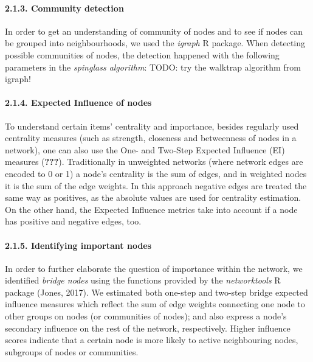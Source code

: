 \documentclass[
]{article}
\begin{document}
\hypertarget{community-detection}{%
\paragraph{2.1.3. Community detection}\label{community-detection}}

In order to get an understanding of community of nodes and to see if
nodes can be grouped into neighbourhoods, we used the \emph{igraph} R
package. When detecting possible communities of nodes, the detection
happened with the following parameters in the \emph{spinglass
algorithm}: TODO: try the walktrap algorithm from igraph!

\hypertarget{expected-influence-of-nodes}{%
\paragraph{2.1.4. Expected Influence of
nodes}\label{expected-influence-of-nodes}}

To understand certain items' centrality and importance, besides
regularly used centrality measures (such as strength, closeness and
betweenness of nodes in a network), one can also use the One- and
Two-Step Expected Influence (EI) measures ({\textbf{???}}).
Traditionally in unweighted networks (where network edges are encoded to
0 or 1) a node's centrality is the sum of edges, and in weighted nodes
it is the sum of the edge weights. In this approach negative edges are
treated the same way as positives, as the absolute values are used for
centrality estimation. On the other hand, the Expected Influence metrics
take into account if a node has positive and negative edges, too.

\hypertarget{identifying-important-nodes}{%
\paragraph{2.1.5. Identifying important
nodes}\label{identifying-important-nodes}}

In order to further elaborate the question of importance within the
network, we identified \emph{bridge nodes} using the functions provided
by the \emph{networktools} R package (Jones, 2017). We estimated both
one-step and two-step bridge expected influence measures which reflect
the sum of edge weights connecting one node to other groups on nodes (or
communities of nodes); and also express a node's secondary influence on
the rest of the network, respectively. Higher influence scores indicate
that a certain node is more likely to active neighbouring nodes,
subgroups of nodes or communities.
\end{document}
